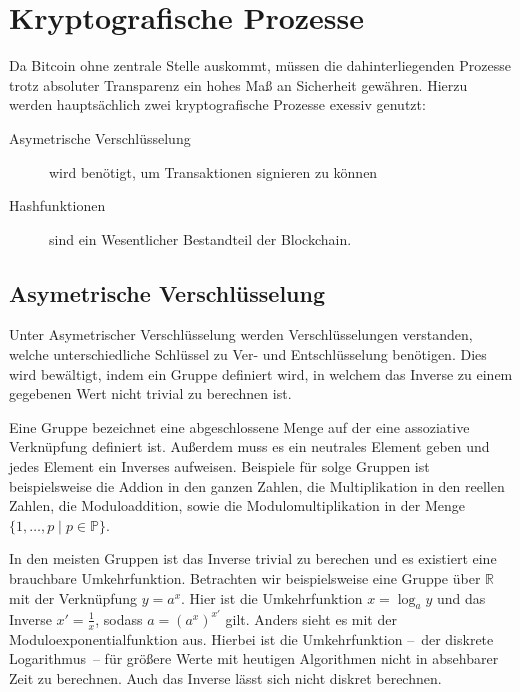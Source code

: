 \section{Kryptografische Prozesse}

Da Bitcoin ohne zentrale Stelle auskommt, müssen die dahinterliegenden Prozesse trotz absoluter Transparenz ein hohes Maß an Sicherheit gewähren.
Hierzu werden hauptsächlich zwei kryptografische Prozesse exessiv genutzt:
\begin{description}
    \item[Asymetrische Verschlüsselung] wird benötigt, um Transaktionen signieren zu können
    \item[Hashfunktionen] sind ein Wesentlicher Bestandteil der Blockchain.
\end{description}

\subsection{Asymetrische Verschlüsselung}

Unter Asymetrischer Verschlüsselung werden Verschlüsselungen verstanden, welche unterschiedliche Schlüssel zu Ver- und Entschlüsselung benötigen.
Dies wird bewältigt, indem ein Gruppe definiert wird, in welchem das Inverse zu einem gegebenen Wert nicht trivial zu berechnen ist.

Eine Gruppe bezeichnet eine abgeschlossene Menge auf der eine assoziative Verknüpfung definiert ist.
Außerdem muss es ein neutrales Element geben und jedes Element ein Inverses aufweisen. 
Beispiele für solge Gruppen ist beispielsweise die Addion in den ganzen Zahlen, die Multiplikation in den reellen Zahlen, die Moduloaddition, sowie die Modulomultiplikation in der Menge $\{ 1, \dotsc, p \mid p \in \mathbb{P}\}$.

In den meisten Gruppen ist das Inverse trivial zu berechen und es existiert eine brauchbare Umkehrfunktion.
Betrachten wir beispielsweise eine Gruppe über $\mathbb{R}$ mit der Verknüpfung $y=a^x$.
Hier ist die Umkehrfunktion $x=\log_a y$ und das Inverse $x'=\frac{1}{x}$, sodass $a=(a^x)^{x'}$ gilt.
Anders sieht es mit der Moduloexponentialfunktion aus.
Hierbei ist die Umkehrfunktion --~der diskrete Logarithmus~-- für größere Werte mit heutigen Algorithmen nicht in absehbarer Zeit zu berechnen.
Auch das Inverse lässt sich nicht diskret berechnen. 

